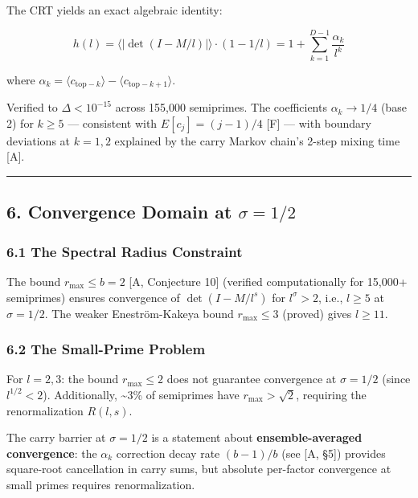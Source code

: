 \documentclass[
  11pt,
]{article}
\begin{document}
The CRT yields an exact algebraic identity:

\[h(l) = \langle|\det(I-M/l)|\rangle \cdot (1-1/l) = 1 + \sum_{k=1}^{D-1}\frac{\alpha_k}{l^k}\]

where
\(\alpha_k = \langle c_{\text{top}-k}\rangle - \langle c_{\text{top}-k+1}\rangle\).

Verified to \(\Delta < 10^{-15}\) across 155,000 semiprimes. The coefficients
\(\alpha_k \to 1/4\) (base 2) for \(k \geq 5\) --- consistent with
\(E[c_j] = (j-1)/4\) {[}F{]} --- with boundary deviations at \(k = 1, 2\)
explained by the carry Markov chain's 2-step mixing time {[}A{]}.

\begin{center}\rule{0.5\linewidth}{0.5pt}\end{center}

\newpage

\subsection{\texorpdfstring{6. Convergence Domain at
\(\sigma = 1/2\)}{6. Convergence Domain at \textbackslash sigma = 1/2}}\label{convergence-domain-at-sigma-12}

\subsubsection{6.1 The Spectral Radius
Constraint}\label{the-spectral-radius-constraint}

The bound \(r_{\max} \leq b = 2\) {[}A, Conjecture 10{]} (verified
computationally for 15,000+ semiprimes) ensures convergence of
\(\det(I - M/l^s)\) for \(l^{\sigma} > 2\), i.e., \(l \geq 5\) at
\(\sigma = 1/2\). The weaker Eneström-Kakeya bound \(r_{\max} \leq 3\) (proved)
gives \(l \geq 11\).

\subsubsection{6.2 The Small-Prime Problem}\label{the-small-prime-problem}

For \(l = 2, 3\): the bound \(r_{\max} \leq 2\) does not guarantee convergence
at \(\sigma = 1/2\) (since \(l^{1/2} < 2\)). Additionally, \textasciitilde3\% of
semiprimes have \(r_{\max} > \sqrt{2}\), requiring the renormalization
\(R(l,s)\).

The carry barrier at \(\sigma = 1/2\) is a statement about
\textbf{ensemble-averaged convergence}: the \(\alpha_k\) correction decay rate
\((b-1)/b\) (see {[}A, §5{]}) provides square-root cancellation in carry sums,
but absolute per-factor convergence at small primes requires renormalization.
\end{document}
